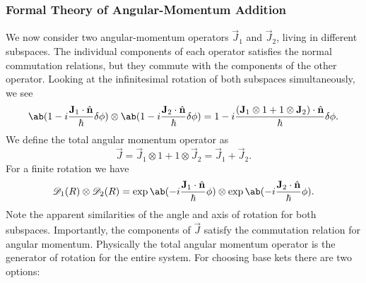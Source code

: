 \subsubsection{Formal Theory of Angular-Momentum Addition}
We now consider two angular-momentum operators $\vec{J}_1$ and $\vec{J}_2$, living in different subspaces. The individual components of each operator satisfies the normal commutation relations, but they commute with the components of the other operator. Looking at the infinitesimal rotation of both subspaces simultaneously, we see
\begin{equation}
    \ab (1 - i \frac{\vec{J}_1 \cdot \hat{\vec{n}}}{\hbar} \delta \phi) \otimes \ab (1 - i \frac{\vec{J}_2 \cdot \hat{\vec{n}}}{\hbar} \delta \phi) = 1 - i \frac{(\vec{J}_1 \otimes 1 + 1 \otimes \vec{J}_2)\cdot \hat{\vec{n}}}{\hbar} \delta\phi.
\end{equation} 
We define the total angular momentum operator as
\begin{equation}
    \vec{J} = \vec{J}_1 \otimes 1 + 1 \otimes \vec{J}_2 = \vec{J}_1 + \vec{J}_2.
\end{equation}
For a finite rotation we have
\begin{equation}
    \mathscr{D}_1(R) \otimes \mathscr{D}_2(R) = \exp\ab(-i \frac{\vec{J}_1 \cdot \hat{\vec{n}}}{\hbar} \phi) \otimes \exp\ab(-i \frac{\vec{J}_2 \cdot \hat{\vec{n}}}{\hbar} \phi).
\end{equation}
Note the apparent similarities of the angle and axis of rotation for both subspaces. Importantly, the components of $\vec{J}$ satisfy the commutation relation for angular momentum. Physically the total angular momentum operator is the generator of rotation for the entire system. For choosing base kets there are two options:
